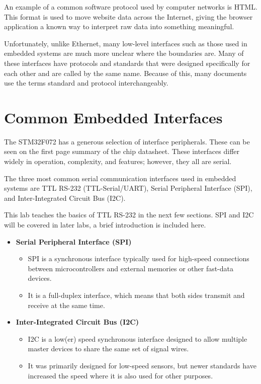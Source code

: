 \documentclass[11pt,fleqn]{book} %
\begin{document}
An example of a common software protocol used by computer networks is HTML. This format is used to move website data across the Internet, giving the browser application a known way to interpret raw data into something meaningful. 

Unfortunately, unlike Ethernet, many low-level interfaces such as those used in embedded systems are much more unclear where the boundaries are. Many of these interfaces have protocols and standards that were designed specifically for each other and are called by the same name. 
Because of this, many documents use the terms standard and protocol interchangeably. 

\section{Common Embedded Interfaces}
The STM32F072 has a generous selection of interface peripherals. These can be seen on the first page summary of the chip datasheet. These interfaces differ widely in operation, complexity, and features; however, they all are serial. 

The three most common serial communication interfaces used in embedded systems are TTL RS-232 (TTL-Serial/UART), Serial Peripheral Interface (SPI), and Inter-Integrated Circuit Bus (I2C). 

This lab teaches the basics of TTL RS-232 in the next few sections. SPI and I2C will be covered in later labs, a brief introduction is included here. 

\begin{itemize}
    \item \textbf{Serial Peripheral Interface (SPI)}
    \begin{itemize}
        \item SPI is a synchronous interface typically used for high-speed connections between microcontrollers and external memories or other fast-data devices.
        \item It is a full-duplex interface, which means that both sides transmit and receive at the same time.
    \end{itemize}
    \item \textbf{Inter-Integrated Circuit Bus (I2C)}
    \begin{itemize}
        \item I2C is a low(er) speed synchronous interface designed to allow multiple master devices to share the same set of signal wires. 
        \item It was primarily designed for low-speed sensors, but newer standards have increased the speed where it is also used for other purposes.
    \end{itemize}
\end{itemize}
\end{document}
